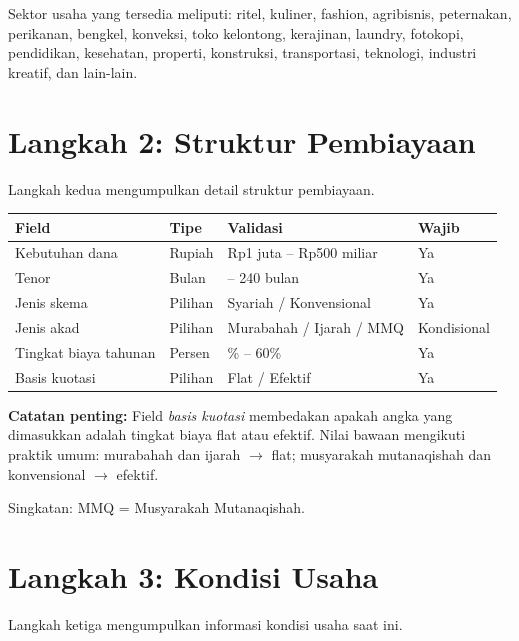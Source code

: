 \documentclass[12pt,a4paper,twoside]{report}
\begin{document}
Sektor usaha yang tersedia meliputi: ritel, kuliner, fashion, agribisnis, peternakan, perikanan, bengkel, konveksi, toko kelontong, kerajinan, laundry, fotokopi, pendidikan, kesehatan, properti, konstruksi, transportasi, teknologi, industri kreatif, dan lain-lain.

\section{Langkah 2: Struktur Pembiayaan}

Langkah kedua mengumpulkan detail struktur pembiayaan.

\begin{longtable}{@{}p{3.5cm}>{\raggedright\arraybackslash}p{3cm}>{\raggedright\arraybackslash}p{4.5cm}>{\raggedright\arraybackslash}p{2cm}@{}}
\toprule
\textbf{Field} & \textbf{Tipe} & \textbf{Validasi} & \textbf{Wajib} \\
\midrule
\endhead
Kebutuhan dana & Rupiah & Rp1 juta -- Rp500 miliar & Ya \\
Tenor & Bulan & 3 -- 240 bulan & Ya \\
Jenis skema & Pilihan & Syariah / Konvensional & Ya \\
Jenis akad & Pilihan & Murabahah / Ijarah / MMQ & Kondisional \\
Tingkat biaya tahunan & Persen & 0\% -- 60\% & Ya \\
Basis kuotasi & Pilihan & Flat / Efektif & Ya \\
\bottomrule
\end{longtable}

\textbf{Catatan penting:} Field \emph{basis kuotasi} membedakan apakah angka yang dimasukkan adalah tingkat biaya flat atau efektif. Nilai bawaan mengikuti praktik umum: murabahah dan ijarah $\to$ flat; musyarakah mutanaqishah dan konvensional $\to$ efektif.

Singkatan: MMQ = Musyarakah Mutanaqishah.

\section{Langkah 3: Kondisi Usaha}

Langkah ketiga mengumpulkan informasi kondisi usaha saat ini.
\end{document}

